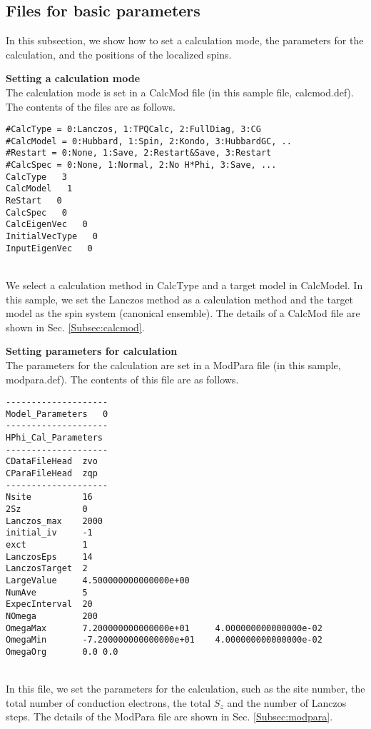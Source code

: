 \subsection{Files for basic parameters}
In this subsection, we show how to set a calculation mode,
the parameters for the calculation, and the positions of the localized spins.
\begin{description}
\item {\bf Setting a calculation mode}\\
  The calculation mode is set in a CalcMod file (in this sample file, calcmod.def).
  The contents of the files are as follows.\\
\begin{minipage}{15cm}
\begin{screen}
\begin{verbatim}
#CalcType = 0:Lanczos, 1:TPQCalc, 2:FullDiag, 3:CG
#CalcModel = 0:Hubbard, 1:Spin, 2:Kondo, 3:HubbardGC, ..
#Restart = 0:None, 1:Save, 2:Restart&Save, 3:Restart
#CalcSpec = 0:None, 1:Normal, 2:No H*Phi, 3:Save, ...
CalcType   3
CalcModel   1
ReStart   0
CalcSpec   0
CalcEigenVec   0
InitialVecType   0
InputEigenVec   0
\end{verbatim}
\end{screen}
\end{minipage}
~\\
We select a calculation method in CalcType and a target model in CalcModel.
In this sample, we set the Lanczos method as a calculation method
and the target model as the spin system (canonical ensemble).
The details of a CalcMod file are shown in Sec. \ref{Subsec:calcmod}.\\

\item {\bf Setting parameters for calculation}\\
  The parameters for the calculation are set in a ModPara file
  (in this sample, modpara.def).
  The contents of this file are as follows.\\
\begin{minipage}{15cm}
\begin{screen}
\begin{verbatim}
--------------------
Model_Parameters   0
--------------------
HPhi_Cal_Parameters
--------------------
CDataFileHead  zvo
CParaFileHead  zqp
--------------------
Nsite          16   
2Sz            0    
Lanczos_max    2000 
initial_iv     -1   
exct           1    
LanczosEps     14   
LanczosTarget  2    
LargeValue     4.500000000000000e+00    
NumAve         5    
ExpecInterval  20   
NOmega         200  
OmegaMax       7.200000000000000e+01     4.000000000000000e-02    
OmegaMin       -7.200000000000000e+01    4.000000000000000e-02    
OmegaOrg       0.0 0.0
\end{verbatim}
\end{screen}
\end{minipage}
~\\
In this file, we set the parameters for the calculation, such as the site number,
the total number of conduction electrons, the total $S_z$ and the number of Lanczos steps.
The details of the ModPara file are shown in Sec. \ref{Subsec:modpara}.\\


\end{description}

